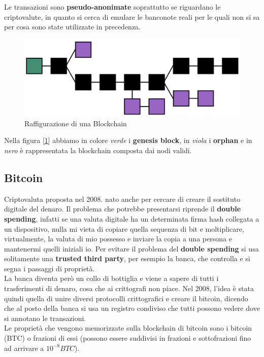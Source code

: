 Le transazioni sono \textbf{pseudo-anonimate} soprattutto se riguardano le criptovalute, in quanto si cerca di emulare le banconote reali per le quali non si sa per cosa sono state utilizzate in precedenza.

\begin{figure}[H]
    \centering
    \includegraphics[scale = 0.25]{Immagini/c7f0503-reorg.png}
    \caption{Raffigurazione di una Blockchain}
    \label{fig:blockchain}
\end{figure}

Nella figura [\ref{fig:blockchain}] abbiamo in colore \textit{verde} i \textbf{genesis block}, in \textit{viola} i \textbf{orphan} e in \textit{nero} è rappresentata la blockchain composta dai nodi validi.

\subsection{Bitcoin}
Criptovaluta proposta nel 2008. nato anche per cercare di creare il sostituto digitale del denaro.
Il problema che potrebbe presentarsi riprende il \textbf{double spending}, infatti se una valuta digitale  ha un determinata firma hash collegata a un dispositivo, nulla mi vieta di copiare quella sequenza di bit e moltiplicare, virtualmente, la valuta di mio possesso e inviare la copia a una persona e mantenermi quelli iniziali io. Per evitare il problema del \textbf{double spending} si usa solitamente una \textbf{trusted third party}, per esempio la banca, che controlla e si segna i passaggi di proprietà.\\
La banca diventa però un collo di bottiglia e viene a sapere di tutti i trasferimenti di denaro, cosa che ai crittografi non piace. Nel 2008, l’idea è stata quindi quella di unire diversi protocolli crittografici e creare il bitcoin, dicendo che al posto della banca si usa un registro condiviso che tutti possono vedere dove si annotano le transazioni. \\

Le proprietà che vengono memorizzate sulla blockchain di bitcoin sono i bitcoin (BTC) o frazioni di essi (possono essere suddivisi in frazioni e sottofrazioni fino ad arrivare a $10^{-8} BTC$).\\

